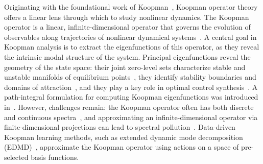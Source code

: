 \documentclass[11pt,a4paper]{article}
\begin{document}
Originating with the foundational work of Koopman~\cite{Koopman1931}, Koopman operator theory offers a linear lens through which to study nonlinear dynamics. The Koopman operator is a linear, infinite-dimensional operator that governs the evolution of observables along trajectories of nonlinear dynamical systems~\cite{Mezic2005,Mezic2020,Mezic2021}. A central goal in Koopman analysis is to extract the eigenfunctions of this operator, as they reveal the intrinsic modal structure of the system. Principal eigenfunctions reveal the geometry of the state space: their joint zero-level sets characterize stable and unstable manifolds of equilibrium points~\cite{Mezic2005}, they identify stability boundaries and domains of attraction~\cite{Mauroy2016,Vaidya2022,Matavalam2024}, and they play a key role in optimal control synthesis~\cite{Vaidya2022control,VaidyaHJB2024}. A path-integral formulation for computing Koopman eigenfunctions was introduced in~\cite{Deka2023}. However, challenges remain: the Koopman operator often has both discrete and continuous spectra~\cite{Mezic2005}, and approximating an infinite-dimensional operator via finite-dimensional projections can lead to spectral pollution~\cite{Colbrook2020}. Data-driven Koopman learning methods, such as extended dynamic mode decomposition (EDMD)~\cite{Williams2015}, approximate the Koopman operator using actions on a space of pre-selected basis functions.
\end{document}
